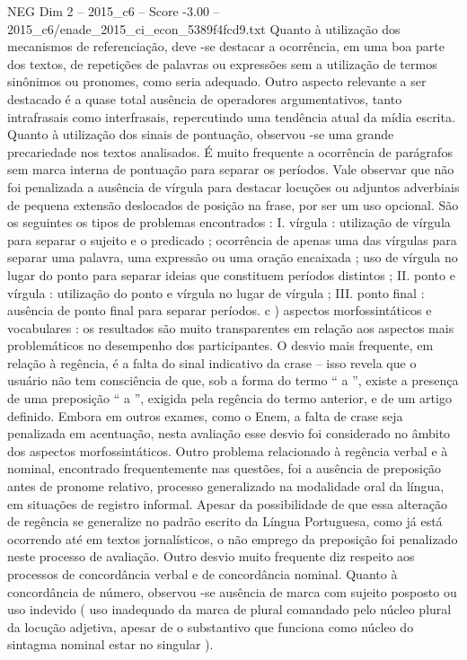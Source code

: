 \begin{textsample}{NEG Dim 2 – 2015\_c6 – Score -3.00 – 2015\_c6/enade\_2015\_ci\_econ\_5389f4fcd9.txt}
Quanto à utilização dos mecanismos de referenciação, deve -se destacar a ocorrência, em uma boa parte dos textos, de repetições de palavras ou expressões sem a utilização de termos sinônimos ou pronomes, como seria adequado.
Outro aspecto relevante a ser destacado é a quase total ausência de operadores argumentativos, tanto intrafrasais como interfrasais, repercutindo uma tendência atual da mídia escrita.
Quanto à utilização dos sinais de pontuação, observou -se uma grande precariedade nos textos analisados.
É muito frequente a ocorrência de parágrafos sem marca interna de pontuação para separar os períodos.
Vale observar que não foi penalizada a ausência de vírgula para destacar locuções ou adjuntos adverbiais de pequena extensão deslocados de posição na frase, por ser um uso opcional.
São os seguintes os tipos de problemas encontrados : I. vírgula : utilização de vírgula para separar o sujeito e o predicado ; ocorrência de apenas uma das vírgulas para separar uma palavra, uma expressão ou uma oração encaixada ; uso de vírgula no lugar do ponto para separar ideias que constituem períodos distintos ; II. ponto e vírgula : utilização do ponto e vírgula no lugar de vírgula ; III. ponto final : ausência de ponto final para separar períodos. c ) aspectos morfossintáticos e vocabulares : os resultados são muito transparentes em relação aos aspectos mais problemáticos no desempenho dos participantes.
O desvio mais frequente, em relação à regência, é a falta do sinal indicativo da crase – isso revela que o usuário não tem consciência de que, sob a forma do termo “ a ”, existe a presença de uma preposição “ a ”, exigida pela regência do termo anterior, e de um artigo definido.
Embora em outros exames, como o Enem, a falta de crase seja penalizada em acentuação, nesta avaliação esse desvio foi considerado no âmbito dos aspectos morfossintáticos.
Outro problema relacionado à regência verbal e à nominal, encontrado frequentemente nas questões, foi a ausência de preposição antes de pronome relativo, processo generalizado na modalidade oral da língua, em situações de registro informal.
Apesar da possibilidade de que essa alteração de regência se generalize no padrão escrito da Língua Portuguesa, como já está ocorrendo até em textos jornalísticos, o não emprego da preposição foi penalizado neste processo de avaliação.
Outro desvio muito frequente diz respeito aos processos de concordância verbal e de concordância nominal.
Quanto à concordância de número, observou -se ausência de marca com sujeito posposto ou uso indevido ( uso inadequado da marca de plural comandado pelo núcleo plural da locução adjetiva, apesar de o substantivo que funciona como núcleo do sintagma nominal estar no singular ).

\end{textsample}
